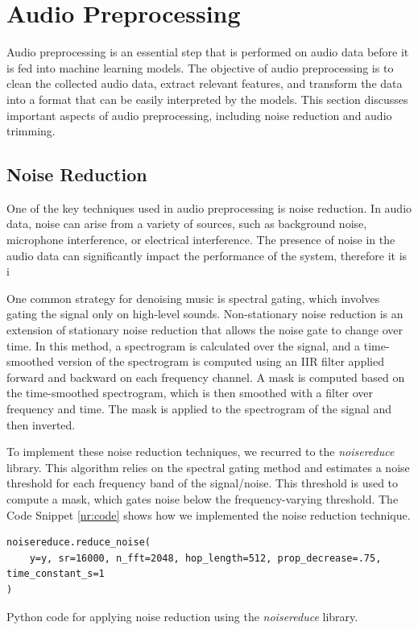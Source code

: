 \section{Audio Preprocessing}


Audio preprocessing is an essential step that is performed on audio data before it is fed into machine learning models. The objective of audio preprocessing is to clean the collected audio data, extract relevant features, and transform the data into a format that can be easily interpreted by the models. This section discusses important aspects of audio preprocessing, including noise reduction and audio trimming.


\subsection{Noise Reduction}

One of the key techniques used in audio preprocessing is noise reduction. In audio data, noise can arise from a variety of sources, such as background noise, microphone interference, or electrical interference. The presence of noise in the audio data can significantly impact the performance of the system, therefore it is i

One common strategy for denoising music is spectral gating, which involves gating the signal only on high-level sounds. Non-stationary noise reduction is an extension of stationary noise reduction that allows the noise gate to change over time. In this method, a spectrogram is calculated over the signal, and a time-smoothed version of the spectrogram is computed using an IIR filter applied forward and backward on each frequency channel. A mask is computed based on the time-smoothed spectrogram, which is then smoothed with a filter over frequency and time. The mask is applied to the spectrogram of the signal and then inverted.

To implement these noise reduction techniques, we recurred to the \textit{noisereduce} library. This algorithm relies on the spectral gating method and estimates a noise threshold for each frequency band of the signal/noise. This threshold is used to compute a mask, which gates noise below the frequency-varying threshold. The Code Snippet \ref{nr:code} shows how we implemented the noise reduction technique.

\begin{listing}[H]
	\begin{verbatim}
noisereduce.reduce_noise(
	y=y, sr=16000, n_fft=2048, hop_length=512, prop_decrease=.75, time_constant_s=1
)
	\end{verbatim}
	\caption{Python code for applying noise reduction using the \textit{noisereduce} library.}
	\label{nr:code}
\end{listing}


